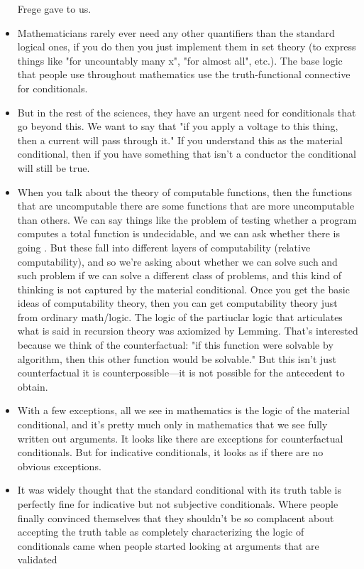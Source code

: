 \documentclass[12pt]{article}
\theoremstyle{definition}
\begin{document}
\begin{itemize}
Frege gave to us. 
\item Mathematicians rarely ever need any other quantifiers than the standard
logical ones, if you do then you just implement them in set theory (to express
things like "for uncountably many x", "for almost all", etc.). The base logic
that people use throughout mathematics use the truth-functional connective for
conditionals.
\item But in the rest of the sciences, they have an urgent need for
conditionals that go beyond this. We want to say that "if you apply a voltage
to this thing, then a current will pass through it." If you understand this as
the material conditional, then if you have something that isn't a conductor the
conditional will still be true. 
\item When you talk about the theory of computable functions, then the
functions that are uncomputable there are some functions that are more
uncomputable than others. We can say things like the problem of testing whether
a program computes a total function is undecidable, and we can ask whether
there is going . But these fall into different layers of computability
(relative computability), and so we're asking about whether we can solve such
and such problem if we can solve a different class of problems, and this kind
of thinking is not captured by the material conditional. Once you get the basic
ideas of computability theory, then you can get computability theory just from
ordinary math/logic. The logic of the partiuclar logic that articulates what is
said in recursion theory was axiomized by Lemming. That's interested because we
think of the counterfactual: "if this function were solvable by algorithm, then
this other function would be solvable." But this isn't just counterfactual it
is counterpossible---it is not possible for the antecedent to obtain.
\item With a few exceptions, all we see in mathematics is the logic of the
material conditional, and it's pretty much only in mathematics that we see
fully written out arguments. It looks like there are exceptions for
counterfactual conditionals. But for indicative conditionals, it looks as if
there are no obvious exceptions.
\item It was widely thought that the standard conditional with its truth table
is perfectly fine for indicative but not subjective conditionals. Where people
finally convinced themselves that they shouldn't be so complacent about
accepting the truth table as completely characterizing the logic of
conditionals came when people started looking at arguments that are validated

\end{itemize}
\end{document}

